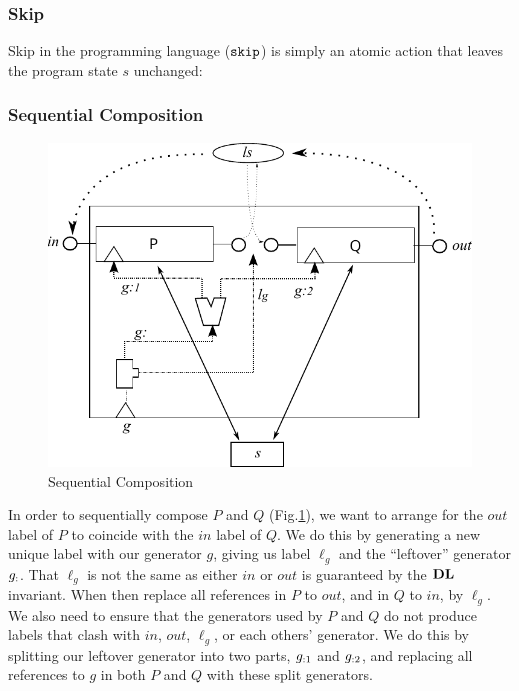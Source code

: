 
\subsubsection{Skip}

Skip in the programming language ($\texttt{skip}$)
is simply an atomic action that leaves the program state $s$ unchanged:

\subsubsection{Sequential Composition}

\begin{figure}
  \centering
  \includegraphics[scale=0.85]{images/seq-comp-actual}
  \caption{Sequential Composition}
  \label{fig:seq-comp}
\end{figure}

In order to sequentially compose $P$ and $Q$ (Fig.\ref{fig:seq-comp}),
we want to arrange for the $out$ label of $P$
to coincide with the $in$ label of $Q$.
We do this by generating a new unique label with our generator $g$,
giving us label $\ell_g$ and the ``leftover'' generator $g_{:}$.
That $\ell_g$ is not the same as either $in$ or $out$
is guaranteed by the $\mathbf{DL}$ invariant.
When then replace all references in $P$ to $out$,
and in $Q$ to $in$, by $\ell_g$.
We also need to ensure that the generators used by $P$ and $Q$
do not produce labels that clash with $in$, $out$, $\ell_g$,
or each others' generator.
We do this by splitting our leftover generator into two parts,
$g_{:1}$ and $g_{:2}$,
and replacing all references to $g$ in both $P$ and $Q$
with these split generators.

